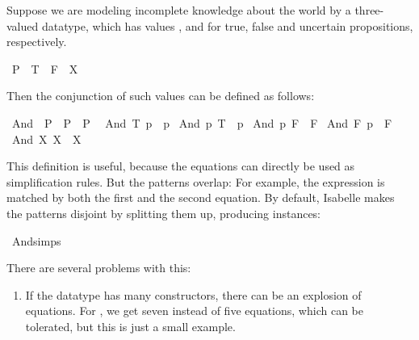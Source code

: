 \begin{isabellebody}
\begin{isamarkuptext}
  Suppose we are modeling incomplete knowledge about the world by a
  three-valued datatype, which has values , 
  and  for true, false and uncertain propositions, respectively.%
\end{isamarkuptext}%
\isamarkuptrue%
\isamarkupfalse%
\ P{}\ {\isacharequal}\ T\ {\isacharbar}\ F\ {\isacharbar}\ X%
\begin{isamarkuptext}%
\noindent Then the conjunction of such values can be defined as follows:%
\end{isamarkuptext}%
\isamarkuptrue%
\isamarkupfalse%
\ And\ {\isacharcolon}{\isacharcolon}\ {\isachardoublequoteopen}P{}\ {\isasymRightarrow}\ P{}\ {\isasymRightarrow}\ P{}{\isachardoublequoteclose}\isanewline
{}\isanewline
\ \ {\isachardoublequoteopen}And\ T\ p\ {\isacharequal}\ p{\isachardoublequoteclose}\isanewline
{\isacharbar}\ {\isachardoublequoteopen}And\ p\ T\ {\isacharequal}\ p{\isachardoublequoteclose}\isanewline
{\isacharbar}\ {\isachardoublequoteopen}And\ p\ F\ {\isacharequal}\ F{\isachardoublequoteclose}\isanewline
{\isacharbar}\ {\isachardoublequoteopen}And\ F\ p\ {\isacharequal}\ F{\isachardoublequoteclose}\isanewline
{\isacharbar}\ {\isachardoublequoteopen}And\ X\ X\ {\isacharequal}\ X{\isachardoublequoteclose}%
\begin{isamarkuptext}%
This definition is useful, because the equations can directly be used
  as simplification rules. But the patterns overlap: For example,
  the expression  is matched by both the first and
  the second equation. By default, Isabelle makes the patterns disjoint by
  splitting them up, producing instances:%
\end{isamarkuptext}%
\isamarkuptrue%
\isamarkupfalse%
\ And{\isachardot}simps%
\begin{isamarkuptext}%
  
  \vspace*{1em}
  \noindent There are several problems with this:

  \begin{enumerate}
  \item If the datatype has many constructors, there can be an
  explosion of equations. For , we get seven instead of
  five equations, which can be tolerated, but this is just a small
  example.


\end{enumerate}
\end{isamarkuptext}
\end{isabellebody}
